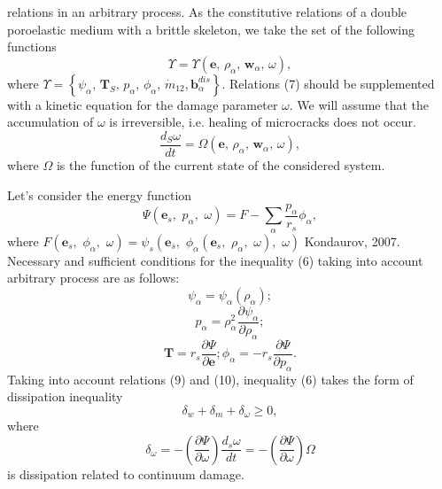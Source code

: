 \documentclass[article,authoryear,jpm]{beg_39}             %
\begin{document}
relations in an arbitrary process. As the constitutive relations of a double poroelastic medium with a brittle skeleton, we take the set of the following functions
\begin{equation}
\Upsilon =\Upsilon \left( \mathbf{e},\,{{\rho }_{\alpha }},\,{{\mathbf{w}}_{\alpha }},\,\omega \right),
\end{equation}
where $\Upsilon =\left\{ {{\psi }_{\alpha }},\,{{\mathbf{T}}_{S}},\,{{p}_{\alpha }},\,{{\phi }_{\alpha }},\,{{{\dot{m}}}_{12}},\mathbf{b}_{\alpha }^{dis} \right\}$. Relations (7) should be supplemented with a kinetic equation for the damage parameter $\omega$. We will assume that the accumulation of $\omega$ is irreversible, i.e. healing of microcracks does not occur.
\begin{equation}
\frac{{{d}_{S}}\omega }{dt}=\Omega \left( \mathbf{e},\,{{\rho }_{\alpha }},\,{{\mathbf{w}}_{\alpha }},\,\omega \right),
\end{equation}
where $\Omega$ is the function of the current state of the considered system.

Let’s consider the energy function $$\Psi \left( {{\mathbf{e}}_{s}},\,\,{{p}_{\alpha }},\,\,\omega \right)=F-\sum\limits_{\alpha }{\frac{{{p}_{\alpha }}}{{{r}_{s}}}{{\phi }_{\alpha }}},$$ where $F\left( {{\mathbf{e}}_{s}},\,\,{{\phi }_{\alpha }},\,\,\omega \right)={{\psi }_{s}}\left( {{\mathbf{e}}_{s}},\,\,{{\phi }_{\alpha }}\left( {{\mathbf{e}}_{s}},\,\,{{\rho }_{\alpha }},\,\,\omega \right),\,\,\omega \right)$ Kondaurov, 2007. Necessary and sufficient conditions for the inequality (6) taking into account arbitrary process are as follows:
\begin{equation}
{{\psi }_{\alpha }}={{\psi }_{\alpha }}\left( {{\rho }_{\alpha }} \right); 
\end{equation}
\begin{equation}
{{p}_{\alpha }}=\rho _{\alpha }^{2}\frac{\partial {{\psi }_{\alpha }}}{\partial {{\rho }_{\alpha }}};
\end{equation}
\begin{equation}
\mathbf{T}={{r}_{s}}\frac{\partial \Psi }{\partial \mathbf{e}}; {{\phi }_{\alpha }}=-{{r}_{s}}\frac{\partial \Psi }{\partial {{p}_{\alpha }}}.
\end{equation}
Taking into account relations (9) and (10), inequality (6) takes the form of dissipation inequality
\begin{equation}
{{\delta }_{w}}+{{\delta }_{m}}+{{\delta }_{\omega }}\ge 0,
\end{equation}
where $${{\delta }_{\omega }}=-\left( \frac{\partial \Psi }{\partial \omega } \right)\frac{{{d}_{s}}\omega }{dt}=-\left( \frac{\partial \Psi }{\partial \omega } \right)\Omega$$ is dissipation related to continuum damage.
\end{document}
